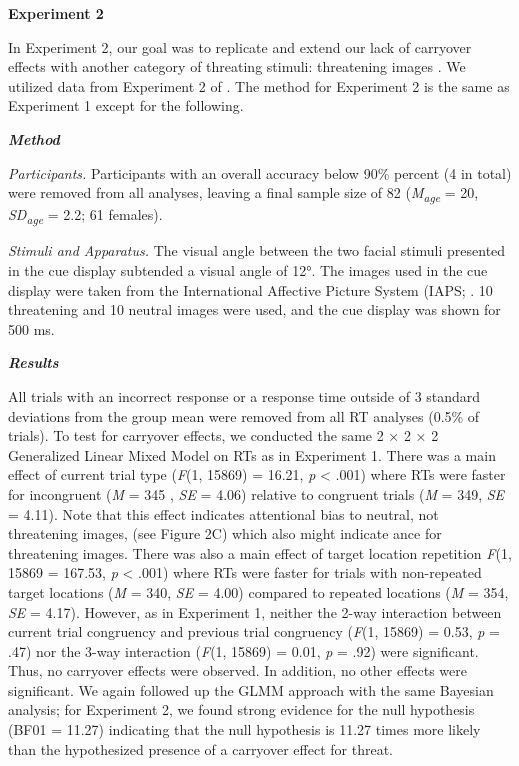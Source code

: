 \documentclass{article}
\begin{document}
\textbf{Experiment 2}

\textbf{}In Experiment 2, our goal was to replicate and extend our lack of carryover effects with another category of threating stimuli: threatening images \parencite{Lang2008}. We utilized data from Experiment 2 of \parencite{Carlson2020}. The method for Experiment 2 is the same as Experiment 1 except for the following.

\emph{\textbf{Method}}

\emph{Participants. }Participants with an overall accuracy below 90\% percent (4 in total) were removed from all analyses, leaving a final sample size of 82 (\emph{M}\textsubscript{\emph{age}} = 20, \emph{SD}\textsubscript{\emph{age}} = 2.2; 61 females). 

\emph{Stimuli and Apparatus. }The visual angle between the two facial stimuli presented in the cue display subtended a visual angle of 12°. The images used in the cue display were taken from the International Affective Picture System (IAPS; \parencite[200][undefined]{Lang2008}. 10 threatening and 10 neutral images were used, and the cue display was shown for 500 ms. 

\emph{\textbf{Results}}

All trials with an incorrect response or a response time outside of 3 standard deviations from the group mean were removed from all RT analyses (0.5\% of trials). To test for carryover effects, we conducted the same 2 × 2 × 2 Generalized Linear Mixed Model on RTs as in Experiment 1. There was a main effect of current trial type (\emph{F}(1, 15869) = 16.21, \emph{p }< .001) where RTs were faster for incongruent (\emph{M }= 345 , \emph{SE }= 4.06) relative to congruent trials (\emph{M }= 349, \emph{SE }= 4.11). Note that this effect indicates attentional bias to neutral, not threatening images, (see Figure 2C) which also might indicate ance for threatening images. There was also a main effect of target location repetition \emph{F}(1, 15869 = 167.53, \emph{p }< .001) where RTs were faster for trials with non-repeated target locations (\emph{M }= 340, \emph{SE }= 4.00) compared to repeated locations (\emph{M }= 354, \emph{SE }= 4.17). However, as in Experiment 1, neither the 2-way interaction between current trial congruency and previous trial congruency (\emph{F}(1, 15869) = 0.53, \emph{p }= .47) nor the 3-way interaction (\emph{F}(1, 15869) = 0.01, \emph{p }= .92) were significant. Thus, no carryover effects were observed. In addition, no other effects were significant. We again followed up the GLMM approach with the same Bayesian analysis; for Experiment 2, we found strong evidence for the null hypothesis (BF01 = 11.27) indicating that the null hypothesis is 11.27 times more likely than the hypothesized presence of a carryover effect for threat. 
\end{document}
